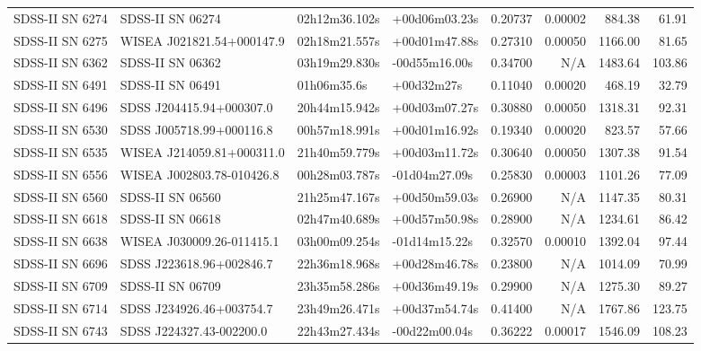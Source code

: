 \begin{longtable}{llllrrrr}
SDSS-II SN 6274  &                SDSS-II SN 06274 &   02h12m36.102s &   +00d06m03.23s &  0.20737 &  0.00002 &   884.38 &       61.91 \\
SDSS-II SN 6275  &       WISEA J021821.54+000147.9 &   02h18m21.557s &   +00d01m47.88s &  0.27310 &  0.00050 &  1166.00 &       81.65 \\
SDSS-II SN 6362  &                SDSS-II SN 06362 &   03h19m29.830s &   -00d55m16.00s &  0.34700 &      N/A &  1483.64 &      103.86 \\
SDSS-II SN 6491  &                SDSS-II SN 06491 &     01h06m35.6s &      +00d32m27s &  0.11040 &  0.00020 &   468.19 &       32.79 \\
SDSS-II SN 6496  &        SDSS J204415.94+000307.0 &   20h44m15.942s &   +00d03m07.27s &  0.30880 &  0.00050 &  1318.31 &       92.31 \\
SDSS-II SN 6530  &        SDSS J005718.99+000116.8 &   00h57m18.991s &   +00d01m16.92s &  0.19340 &  0.00020 &   823.57 &       57.66 \\
SDSS-II SN 6535  &       WISEA J214059.81+000311.0 &   21h40m59.779s &   +00d03m11.72s &  0.30640 &  0.00050 &  1307.38 &       91.54 \\
SDSS-II SN 6556  &       WISEA J002803.78-010426.8 &   00h28m03.787s &   -01d04m27.09s &  0.25830 &  0.00003 &  1101.26 &       77.09 \\
SDSS-II SN 6560  &                SDSS-II SN 06560 &   21h25m47.167s &   +00d50m59.03s &  0.26900 &      N/A &  1147.35 &       80.31 \\
SDSS-II SN 6618  &                SDSS-II SN 06618 &   02h47m40.689s &   +00d57m50.98s &  0.28900 &      N/A &  1234.61 &       86.42 \\
SDSS-II SN 6638  &       WISEA J030009.26-011415.1 &   03h00m09.254s &   -01d14m15.22s &  0.32570 &  0.00010 &  1392.04 &       97.44 \\
SDSS-II SN 6696  &        SDSS J223618.96+002846.7 &   22h36m18.968s &   +00d28m46.78s &  0.23800 &      N/A &  1014.09 &       70.99 \\
SDSS-II SN 6709  &                SDSS-II SN 06709 &   23h35m58.286s &   +00d36m49.19s &  0.29900 &      N/A &  1275.30 &       89.27 \\
SDSS-II SN 6714  &        SDSS J234926.46+003754.7 &   23h49m26.471s &   +00d37m54.74s &  0.41400 &      N/A &  1767.86 &      123.75 \\
SDSS-II SN 6743  &        SDSS J224327.43-002200.0 &   22h43m27.434s &   -00d22m00.04s &  0.36222 &  0.00017 &  1546.09 &      108.23 \\

\end{longtable}

